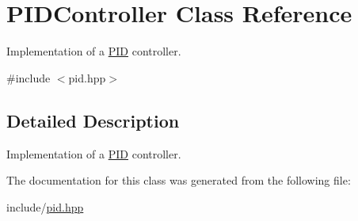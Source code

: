 \hypertarget{classPIDController}{}\section{P\+I\+D\+Controller Class Reference}
\label{classPIDController}


Implementation of a \hyperlink{classPID}{P\+ID} controller.  




{\ttfamily \#include $<$pid.\+hpp$>$}



\subsection{Detailed Description}
Implementation of a \hyperlink{classPID}{P\+ID} controller. 

The documentation for this class was generated from the following file\+:\begin{DoxyCompactItemize}
\item 
include/\hyperlink{pid_8hpp}{pid.\+hpp}\end{DoxyCompactItemize}
